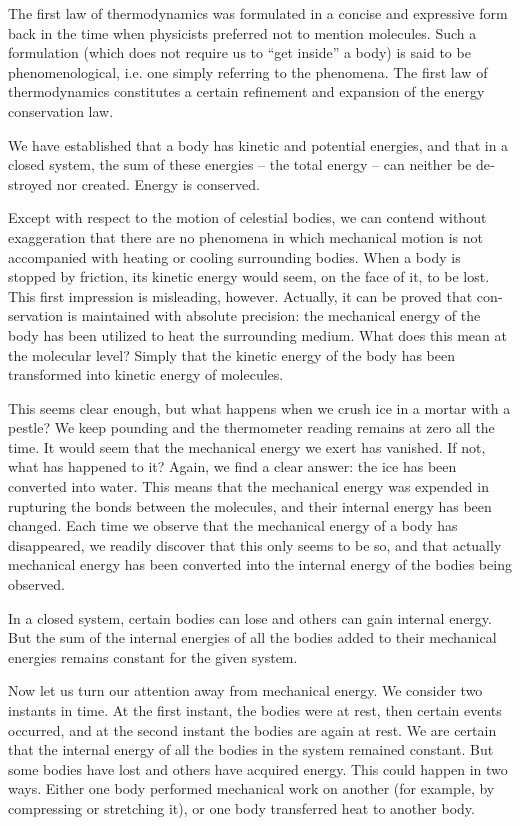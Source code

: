 The first law of thermodynamics was formulated in a concise and expressive form back in the time when phys­icists preferred not to mention molecules. Such a formu­lation (which does not require us to ``get inside'' a body) is said to be phenomenological, i.e. one simply referring to the phenomena. The first law of thermodynamics con­stitutes a certain refinement and expansion of the energy conservation law.

We have established that a body has kinetic and po­tential energies, and that in a closed system, the sum of these energies -- the total energy -- can neither be de­stroyed nor created. Energy is conserved.

Except with respect to the motion of celestial bodies, we can contend without exaggeration that there are no phenomena in which mechanical motion is not accompa­nied with heating or cooling surrounding bodies. When a body is stopped by friction, its kinetic energy would seem, on the face of it, to be lost. This first impression is mis­leading, however. Actually, it can be proved that con­servation is maintained with absolute precision: the mechanical energy of the body has been utilized to heat the surrounding medium. What does this mean at the molec­ular level? Simply that the kinetic energy of the body has been transformed into kinetic energy of molecules. 

This seems clear enough, but what happens when we crush ice in a mortar with a pestle? We keep pounding and the thermometer reading remains at zero all the time. It would seem that the mechanical energy we exert has vanished. If not, what has happened to it? Again, we find a clear answer: the ice has been converted into water. This means that the mechanical energy was expended in rupturing the bonds between the molecules, and their internal energy has been changed. Each time we observe that the mechanical energy of a body has disappeared, we readily discover that this only seems to be so, and that actually mechanical energy has been converted into the
internal energy of the bodies being observed.

In a closed system, certain bodies can lose and others can gain internal energy. But the sum of the internal ener­gies of all the bodies added to their mechanical energies remains constant for the given system.

Now let us turn our attention away from mechanical energy. We consider two instants in time. At the first instant, the bodies were at rest, then certain events oc­curred, and at the second instant the bodies are again at rest. We are certain that the internal energy of all the bodies in the system remained constant. But some bodies have lost and others have acquired energy. This could happen in two ways. Either one body performed mechanical work on another (for example, by compressing or stretching it), or one body transferred heat to another body.

